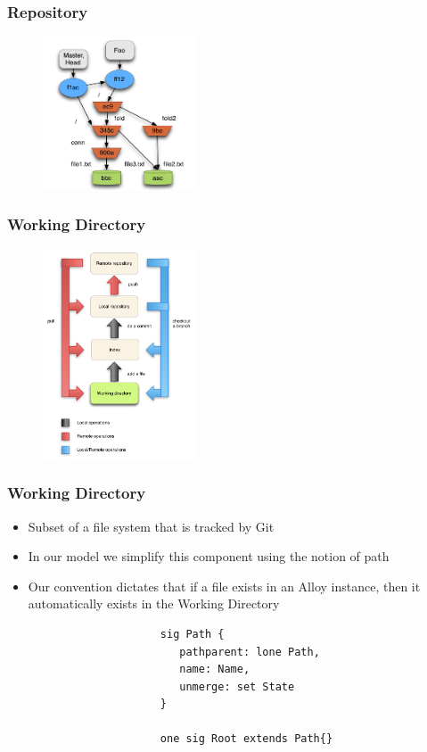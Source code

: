 \documentclass{beamer}
\begin{document}
\begin{frame}
	\frametitle{Repository}
	\begin{figure}
		\centering
		\includegraphics[width=0.4\textwidth]{images/object_assoc.png}
	\end{figure}
\end{frame}

\begin{frame}
   \frametitle{Working Directory}
   \begin{figure}
      \centering
      \includegraphics[width=0.4\textwidth]{images/workflow3.png}
   \end{figure}
\end{frame}

\begin{frame}[fragile]
   \frametitle{Working Directory}
   \begin{itemize}
      \item Subset of a file system that is tracked by Git
   	\item In our model we simplify this component using the notion
      of path
	   \item Our convention dictates that if a file exists in an Alloy
	   instance, then it automatically exists in the Working Directory
   \end{itemize}
   \tiny
   \color{blue}
   \begin{lstlisting}
                        sig Path {
                           pathparent: lone Path,
                           name: Name,
                           unmerge: set State
                        }

                        one sig Root extends Path{}
   \end{lstlisting}
\end{frame}
\end{document}
